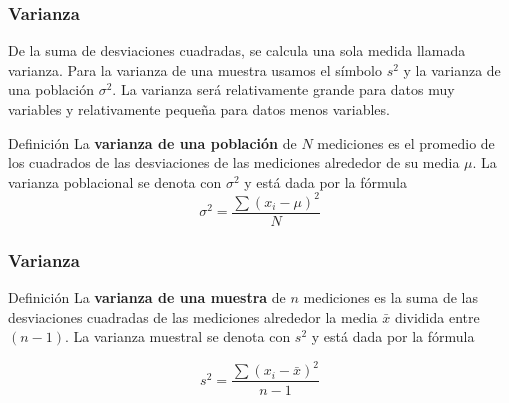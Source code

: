 \documentclass[spanish]{beamer}
\begin{document}
\begin{frame}
\frametitle{Varianza}
De la suma de desviaciones cuadradas, se calcula una sola medida llamada varianza. Para la varianza de una muestra usamos el símbolo $s^2$ y la varianza de una población $\sigma^2$. La varianza será relativamente grande para datos muy variables y relativamente pequeña para datos menos variables.
\begin{block}{Definición}
La \textbf{varianza de una población} de $N$ mediciones es el promedio de los
cuadrados de las desviaciones de las mediciones alrededor de su media $\mu$. La varianza poblacional se denota con $\sigma^2$ y está dada por la fórmula
\begin{equation*}
\sigma^2= \frac{\sum {(x_{i}- \mu)}^2}{N}
\end{equation*}
\end{block}

\end{frame}
\begin{frame}
\frametitle{Varianza}

\begin{block}{Definición}
La \textbf{varianza de una muestra} de $n$ mediciones es la suma de las desviaciones cuadradas de las mediciones alrededor la media $\bar{x}$ dividida entre $(n-1)$. La varianza muestral se denota con $s^2$ y está dada por la fórmula 

\begin{equation*}
s^2= \frac{\sum {(x_{i}- \bar{x})}^2}{n-1}
\end{equation*}
\end{block}

\end{frame}
\end{document}
